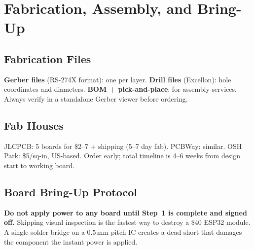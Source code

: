 \section{Fabrication, Assembly, and Bring-Up}

\subsection{Fabrication Files}
\textbf{Gerber files} (RS-274X format): one per layer. \textbf{Drill files} (Excellon): hole coordinates and diameters. \textbf{BOM + pick-and-place}: for assembly services. Always verify in a standalone Gerber viewer before ordering.

\subsection{Fab Houses}
JLCPCB: 5 boards for \$2--7 + shipping (5--7 day fab). PCBWay: similar. OSH Park: \$5/sq-in, US-based. Order early; total timeline is 4--6 weeks from design start to working board.

\subsection{Board Bring-Up Protocol}

\begin{warningbox}
\textbf{Do not apply power to any board until Step~1 is complete and signed off.} Skipping visual inspection is the fastest way to destroy a \$40 ESP32 module. A single solder bridge on a 0.5\,mm-pitch IC creates a dead short that damages the component the instant power is applied.
\end{warningbox}

